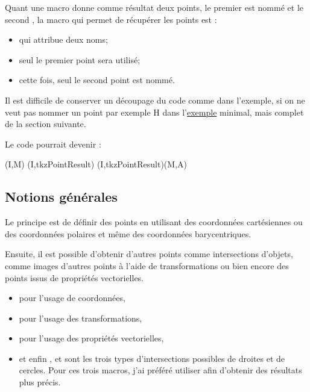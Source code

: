  Quant une macro donne comme résultat deux points, le premier est nommé  et le second , la macro qui permet de récupérer les points est :
 
 \begin{itemize}
   \item {} qui attribue deux noms;
   \item {} seul le premier point sera utilisé;
   \item {} cette fois, seul le second point est nommé.
 \end{itemize}
Il est difficile de conserver un découpage du code comme dans l'exemple, si on ne veut pas nommer un point par exemple H dans l'\hyperlink{firstex}{exemple} minimal, mais complet de la section suivante.

Le code pourrait devenir :

\begin{tkzltxexample}[]
 \tkzDefPointWith[orthogonal](I,M) %
 \tkzDrawSegment[style=dashed](I,tkzPointResult)
 \tkzInterLC(I,tkzPointResult)(M,A)    
\end{tkzltxexample}

\subsection{Notions générales}

Le principe est de définir des points en utilisant des coordonnées cartésiennes ou des coordonnées polaires et même des coordonnées barycentriques. 

Ensuite, il est possible d'obtenir d'autres points comme intersections d'objets, comme images d'autres points à l'aide de transformations ou bien encore des points issus de propriétés vectorielles.

\begin{itemize}
   \item {} pour l'usage de coordonnées,
      \item {} pour l'usage des transformations,
      \item {} pour l'usage des propriétés vectorielles,
   \item et enfin ,  et  sont les trois types d'intersections possibles  de droites et de cercles. Pour ces trois macros, j'ai préféré utiliser  afin d'obtenir des résultats plus précis.
\end{itemize}



